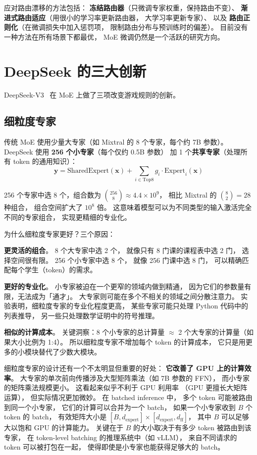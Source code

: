 应对路由漂移的方法包括：
\textbf{冻结路由器}（只微调专家权重，保持路由不变）、
\textbf{渐进式路由适应}（用很小的学习率更新路由器，
大学习率更新专家）、
以及 \textbf{路由正则化}（在微调损失中加入惩罚项，
限制路由分布与预训练时的偏差）。
目前没有一种方法在所有场景下都最优，
MoE 微调仍然是一个活跃的研究方向。

\section{DeepSeek 的三大创新}

DeepSeek-V3~\cite{deepseekv3} 在 MoE 上做了三项改变游戏规则的创新。

\subsection{细粒度专家}

传统 MoE 使用少量大专家（如 Mixtral 的 8 个专家，每个约 7B 参数）。
DeepSeek 使用 \textbf{256 个小专家}（每个仅约 0.5B 参数）
加 1 个\textbf{共享专家}（处理所有 token 的通用知识）：
\begin{equation}
  \mathbf{y} = \mathrm{SharedExpert}(\mathbf{x})
  + \sum_{i \in \mathrm{Top8}} g_i \cdot \mathrm{Expert}_i(\mathbf{x})
\end{equation}

256 个专家中选 8 个，组合数为
$\binom{256}{8} \approx 4.4 \times 10^{9}$，
相比 Mixtral 的 $\binom{8}{2} = 28$ 种组合，
组合空间扩大了 $10^{8}$ 倍。
这意味着模型可以为不同类型的输入激活完全不同的专家组合，
实现更精细的专业化。

为什么细粒度专家更好？三个原因：

\textbf{更灵活的组合}。
8 个大专家中选 2 个，
就像只有 8 门课的课程表中选 2 门，
选择空间很有限。
256 个小专家中选 8 个，
就像 256 门课中选 8 门，
可以精确匹配每个学生（token）的需求。

\textbf{更好的专业化}。
小专家被迫在一个更窄的领域内做到精通，
因为它们的参数量有限，无法成为「通才」。
大专家则可能在多个不相关的领域之间分散注意力。
实验表明，细粒度专家的专业化程度更高，
某些专家可能只处理 Python 代码中的列表推导，
另一些只处理数学证明中的符号推理。

\textbf{相似的计算成本}。
关键洞察：8 个小专家的总计算量
$\approx$ 2 个大专家的计算量（如果大小比例为 1:4）。
所以细粒度专家不增加每个 token 的计算成本，
它只是用更多的小模块替代了少数大模块。

细粒度专家的设计还有一个不太明显但重要的好处：
\textbf{它改善了 GPU 上的计算效率}。
大专家的单次前向传播涉及大型矩阵乘法（如 7B 参数的 FFN），
而小专家的矩阵乘法规模更小。
这看起来似乎不利于 GPU 利用率
（GPU 更擅长大矩阵运算），
但实际情况更加微妙。
在 batched inference 中，
多个 token 可能被路由到同一个小专家，
它们的计算可以合并为一个 batch，
如果一个小专家收到 $B$ 个 token 的 batch，
有效矩阵大小是 $[B, d_{\text{expert}}] \times [d_{\text{expert}}, d_{\text{ff}}]$，
其中 $B$ 可以足够大以饱和 GPU 的计算能力。
关键在于 $B$ 的大小取决于有多少 token 被路由到该专家，
在 token-level batching 的推理系统中（如 vLLM），
来自不同请求的 token 可以被打包在一起，
使得即使是小专家也能获得足够大的 batch。


